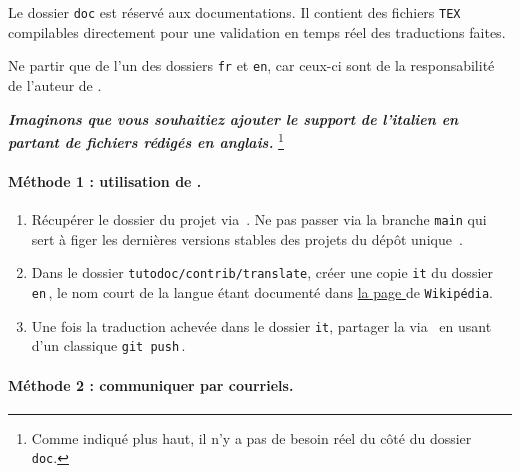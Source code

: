 \documentclass{tutodoc}
\begin{document}
\begin{tdocnote}
    Le dossier \verb#doc# est réservé aux documentations. Il contient des fichiers \verb#TEX# compilables directement pour une validation en temps réel des traductions faites.
\end{tdocnote}


\begin{tdocwarn}
    Ne partir que de l'un des dossiers \verb#fr# et \verb#en#, car ceux-ci sont de la responsabilité de l'auteur de \thisproj.
\end{tdocwarn}


\medskip


\emph{\textbf{Imaginons que vous souhaitiez ajouter le support de l'italien en partant de fichiers rédigés en anglais.}}%
\footnote{
    Comme indiqué plus haut, il n'y a pas de besoin réel du côté du dossier \texttt{doc}.
}


\paragraph{Méthode 1 : utilisation de \git.}

\begin{enumerate}
    \item Récupérer le dossier du projet via \thisrepo\,.
    Ne pas passer via la branche \verb#main# qui sert à figer les dernières versions stables des projets du dépôt unique \thismonorepo\,.

    \item Dans le dossier \verb#tutodoc/contrib/translate#, créer une copie \verb#it# du dossier \verb#en#\,, le nom court de la langue étant documenté dans
    \href{https://en.wikipedia.org/wiki/IETF_language_tag#List_of_common_primary_language_subtags}%
         {la page }
    de \texttt{Wikipédia}.

    \item Une fois la traduction achevée dans le dossier \verb#it#, partager la via \thisrepo\ en usant d'un classique \verb#git push#\,.
\end{enumerate}


\paragraph{Méthode 2 : communiquer par courriels.}
\end{document}

